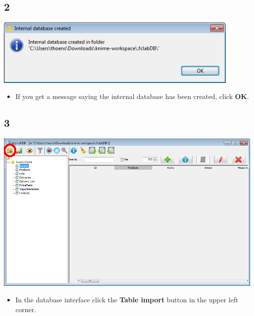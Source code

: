 \documentclass{beamer}
\begin{document}
\subsection{2}
\begin{frame}
	\begin{center}
  		\includegraphics[width=0.9\textwidth]{2.png}
	\end{center}
	\begin{itemize}
		\item If you get a message saying the internal database has been created, click \textbf{OK}.
	\end{itemize}
\end{frame}

\subsection{3}
\begin{frame}
	\begin{center}
  		\includegraphics[height=0.6\textheight]{3.png}
	\end{center}
	\begin{itemize}
		\item In the database interface click the \textbf{Table import} button in the upper left corner.
	\end{itemize}
\end{frame}
\end{document}
